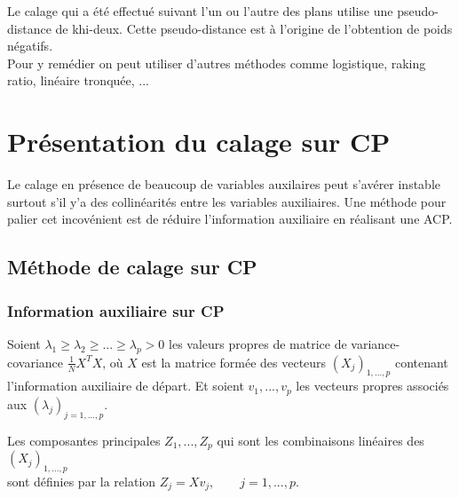 \documentclass[11pt,fleqn]{book} %
\begin{document}
\begin{remark}
Le calage qui a été effectué suivant l'un ou l'autre des plans utilise une pseudo-distance de khi-deux. Cette pseudo-distance est à l'origine de l'obtention de poids négatifs.\\ 
Pour y remédier on peut utiliser d'autres méthodes comme logistique, raking ratio, linéaire tronquée, ...  
\end{remark}

 
 
 



\chapter{Présentation du calage sur CP}


Le calage en présence de beaucoup de variables auxilaires peut s'avérer instable surtout s'il y'a des collinéarités entre les variables auxiliaires. Une méthode pour palier cet incovénient est de réduire l'information auxiliaire en réalisant une ACP.

\section{Méthode de calage sur CP}

\subsection{Information auxiliaire sur CP}

Soient $\lambda_1\ge \lambda_2\ge ... \ge \lambda_p > 0$ les valeurs propres de matrice de variance-covariance $\frac{1}{N}X^{T}X$, où $X$ est la matrice formée des vecteurs $(X_j)_{1,...,p}$ contenant l'information auxiliaire de départ. Et soient $v_1,...,v_p$ les vecteurs propres associés aux $(\lambda_j)_{j=1,...,p}$.

\vspace{1em}

Les composantes principales \: $Z_1,...,Z_p$ \: qui sont les combinaisons linéaires des $(X_j)_{1,...,p}$ \\
sont définies par la relation  \: $Z_j=X v_j, \quad\quad j=1,...,p$.
\end{document}
